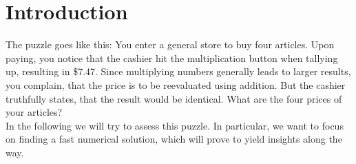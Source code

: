 \documentclass[english, parskip=full]{scrartcl}
\title{\titel}
\author{\autor}
\date{\today}
\begin{document}
\begin{titlepage}
\maketitle  %
\tableofcontents  %
\end{titlepage}

\section{Introduction}
The puzzle goes like this: You enter a general store to buy four articles. Upon paying, you notice that the cashier hit the multiplication button when tallying up, resulting in \$7.47. Since multiplying numbers generally leads to larger results, you complain, that the price is to be reevaluated using addition. But the cashier truthfully states, that the result would be identical. What are the four prices of your articles?\\
In the following we will try to assess this puzzle. In particular, we want to focus on finding a fast numerical solution, which will prove to yield insights along the way.
\end{document}
